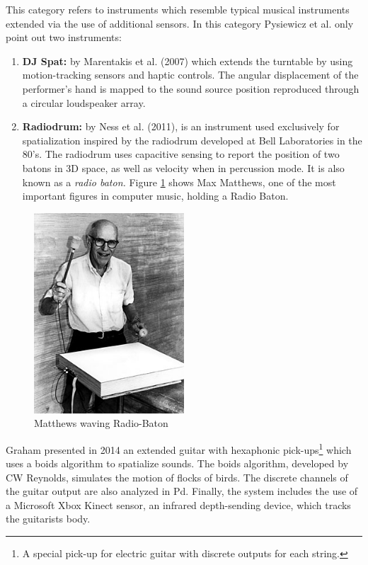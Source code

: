 This category refers to instruments which resemble typical musical instruments extended via the use of additional sensors. In this category Pysiewicz et al. only point out two instruments: 

\begin{enumerate}
    \item \textbf{DJ Spat:} by Marentakis et al. (2007) which extends the turntable by using motion-tracking sensors and haptic controls. The angular displacement of the performer's hand is mapped to the sound source position reproduced through a circular loudspeaker array. 
    \item \textbf{Radiodrum:} by Ness et al. (2011), is an instrument used exclusively for spatialization inspired by the radiodrum developed at Bell Laboratories in the 80's. The radiodrum uses capacitive sensing to report the position of two batons in 3D space, as well as velocity when in percussion mode. It is also known as a \textit{radio baton.} Figure \ref{fig:baton} shows Max Matthews, one of the most important figures in computer music, holding a Radio Baton.
\end{enumerate}

\begin{figure}[ht!]%
\centering
\includegraphics[width=0.5\textwidth]{img/mathews260.jpg} 
\caption{Matthews waving Radio-Baton \cite{FileMath82online}}
\label{fig:baton}
\end{figure}

Graham \cite{graham2014gesture} presented in 2014 an extended guitar with hexaphonic pick-ups\footnote{A special pick-up for electric guitar with discrete outputs for each string.} which uses a boids algorithm to spatialize sounds. The boids algorithm, developed by CW Reynolds, simulates the motion of flocks of birds. The discrete channels of the guitar output are also analyzed in Pd. Finally, the system includes the use of a Microsoft Xbox Kinect sensor, an infrared depth-sending device, which tracks the guitarists body.

